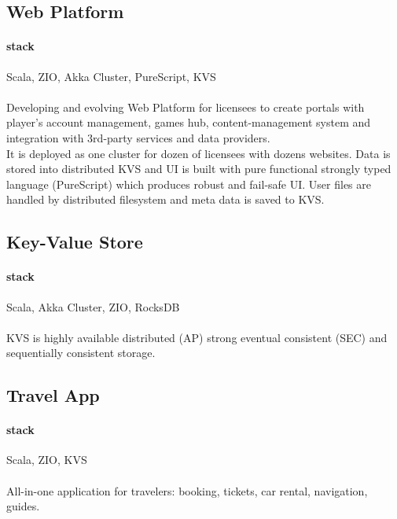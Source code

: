\subsection{Web Platform}
\paragraph{stack} Scala, ZIO, Akka Cluster, PureScript, KVS
\paragraph{}
Developing and evolving Web Platform for licensees to create portals with player's account management, games hub, content-management system and integration with 3rd-party services and data providers.\\
It is deployed as one cluster for dozen of licensees with dozens websites. Data is stored into distributed KVS and UI is built with pure functional strongly typed language (PureScript) which produces robust and fail-safe UI. User files are handled by distributed filesystem and meta data is saved to KVS.

\subsection{Key-Value Store}
\paragraph{stack} Scala, Akka Cluster, ZIO, RocksDB
\paragraph{}
KVS is highly available distributed (AP) strong eventual consistent (SEC) and sequentially consistent storage.

\subsection{Travel App}
\paragraph{stack} Scala, ZIO, KVS
\paragraph{}
All-in-one application for travelers: booking, tickets, car rental, navigation, guides.



